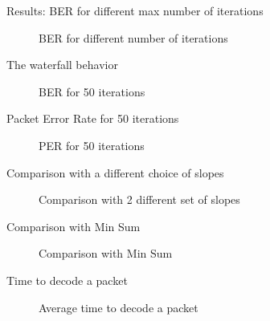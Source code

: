 \documentclass[pdf]
          {beamer}
\newlength\fheight
\newlength\fwidth
\begin{document}
\begin{frame}{Results: BER for different max number of iterations}
	\begin{figure}[t]
		\centering
		\setlength{}
		\setlength{}
		
		\caption{\small{BER for different number of iterations}}
	\end{figure}
\end{frame}

\begin{frame}{The waterfall behavior}
	\begin{figure}[t]
		\centering
		\setlength{}
		\setlength{}
		
		\caption{\small{BER for 50 iterations}}
	\end{figure}
\end{frame}

\begin{frame}{Packet Error Rate for 50 iterations}
	\begin{figure}[t]
		\centering
		\setlength{}
		\setlength{}
		
		\caption{\small{PER for 50 iterations}}
	\end{figure}
\end{frame}

\begin{frame}{Comparison with a different choice of slopes}
	\begin{figure}[t]
		\centering
		\setlength{}
		\setlength{}
		
		\caption{\small{Comparison with 2 different set of slopes}}
	\end{figure}
\end{frame}

\begin{frame}{Comparison with Min Sum}
	\begin{figure}[t]
		\centering
		\setlength{}
		\setlength{}
		
		\caption{\small{Comparison with Min Sum}}
	\end{figure}
\end{frame}

\begin{frame}{Time to decode a packet}
	\begin{figure}[t]
		\centering
		\setlength{}
		\setlength{}
		
		\caption{\small{Average time to decode a packet}}
	\end{figure}
\end{frame}
\end{document}
